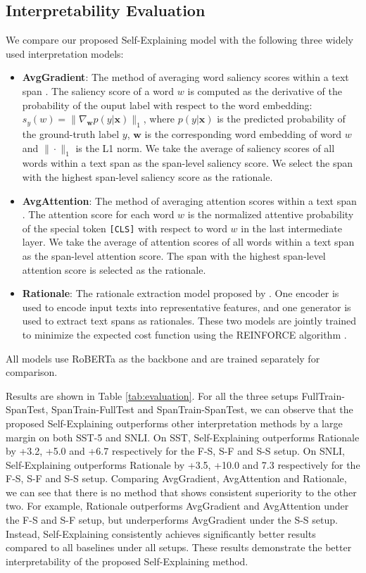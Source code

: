 \documentclass[11pt,a4paper]{article}
\begin{document}
\subsection{Interpretability Evaluation}
We compare our proposed Self-Explaining model with the following three widely used interpretation models:
\begin{itemize}
    \item {\bf AvgGradient}: The method of averaging word saliency scores within a text span \citep{li2015visualizing,feng2018pathologies}.
    The saliency score of a word $w$ is computed as the derivative of the probability of the ouput label with respect to the word embedding: $s_y(w)=\|\nabla_{\bm{w}}p(y|\bm{x})\|_1$, where $p(y|\bm{x})$ is the predicted probability of the ground-truth label $y$, $\bm{w}$ is the corresponding word embedding of word $w$ and $\|\cdot\|_1$ is the L1 norm. We take the average of saliency scores of all words within a text span as the span-level saliency score. We select the span with the highest span-level saliency score as the rationale.
    \item {\bf AvgAttention}: The method of averaging attention scores within a text span \citep{vig2019analyzing,tenney2019bert,clark2019does}. The attention score for each word $w$ is the normalized attentive probability of the special token \texttt{[CLS]} with respect to
    word
     $w$ in the last intermediate layer. We take the average of attention scores of all words within a text span as the span-level attention score. The span with the highest 
     span-level 
     attention score is selected as the rationale.
    \item {\bf Rationale}: The rationale extraction model proposed by \citet{lei2016rationalizing}. One encoder is used to encode input texts into representative features, and one generator is used to extract text spans as rationales. These two models are jointly trained to minimize the expected cost function using the REINFORCE algorithm \citep{DBLP:journals/ml/Williams92}.

\end{itemize}
All models use RoBERTa \citep{yinhan2019roberta} as the backbone and are trained separately for comparison.

Results are shown in Table \ref{tab:evaluation}. For all the three setups FullTrain-SpanTest, SpanTrain-FullTest and SpanTrain-SpanTest, we can observe that the proposed Self-Explaining outperforms other interpretation methods by a large margin on both SST-5 and SNLI. On SST, Self-Explaining outperforms Rationale by +3.2, +5.0 and +6.7 respectively for the F-S, S-F and S-S setup. On SNLI, Self-Explaining outperforms Rationale by +3.5, +10.0 and 7.3 respectively for the F-S, S-F and S-S setup. 
Comparing AvgGradient, AvgAttention and Rationale, we can see that there is no method that shows consistent  superiority to the other two. For example, Rationale outperforms AvgGradient and AvgAttention under the F-S and S-F setup, but underperforms AvgGradient under the S-S setup. Instead, Self-Explaining consistently achieves significantly better results compared to all baselines  under all setups.
These results demonstrate the better interpretability of the proposed Self-Explaining method.
\end{document}
